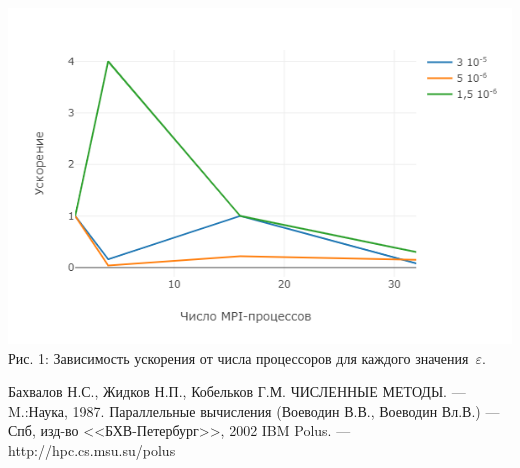     \begin{center}
        \includegraphics[width=0.8\linewidth]{newplot.png}
        \newline
        Рис. 1: Зависимость ускорения от числа процессоров для каждого значения~$\varepsilon$.
    \end{center}
\clearpage
    \begin{thebibliography}{9}
            Бахвалов Н.С., Жидков Н.П., Кобельков Г.М. ЧИСЛЕННЫЕ МЕТОДЫ. --- M.:Наука, 1987.
             Параллельные вычисления (Воеводин В.В., Воеводин Вл.В.) --- Спб, изд-во <<БХВ-Петербург>>, 2002
             IBM Polus. --- http://hpc.cs.msu.su/polus
    \end{thebibliography}
\clearpage
